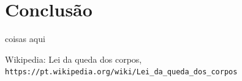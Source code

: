 \documentclass[a4paper]{article}
\begin{document}
\section{Conclusão}
    coisas aqui

\begin{thebibliography}{1}

    Wikipedia: Lei da queda dos corpos,
    \\\texttt{https://pt.wikipedia.org/wiki/Lei\_da\_queda\_dos\_corpos}
\end{thebibliography}
\end{document}
